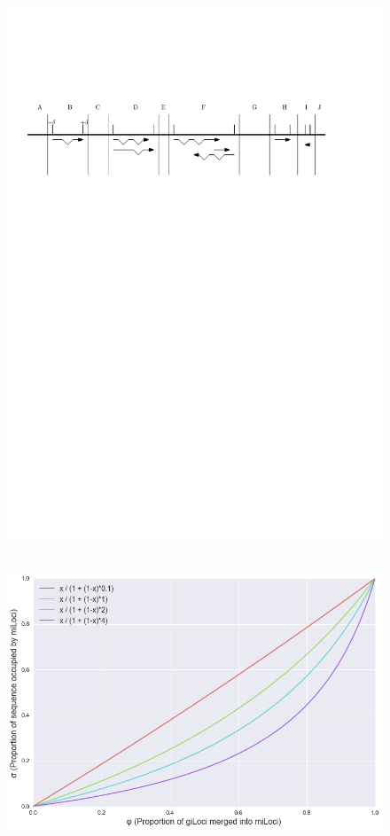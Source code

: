 \begin{figure}[!bht]
\includegraphics[width=6in]{Assets/Graphics/iLoci/ilocus-demo.pdf}
\centering
\caption{~}
\label{Fig:iLoci}
\end{figure}


\begin{figure}[h]
\includegraphics[width=6in]{Assets/Graphics/iLoci/compactness-theoretical.png}
\centering
\caption{~}
\label{Fig:CompactnessModel}
\end{figure}

